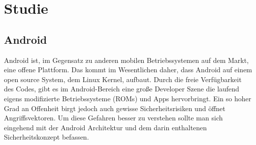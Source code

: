 \chapter{Studie}
\section{Android}
Android ist, im Gegensatz zu anderen mobilen Betriebssystemen auf dem Markt, eine offene Plattform. Das kommt im Wesentlichen daher, dass Android auf einem open source System, dem Linux Kernel, aufbaut. Durch die freie Verfügbarkeit des Codes, gibt es im Android-Bereich eine große Developer Szene die laufend eigens modifizierte Betriebssysteme (ROMs) und Apps hervorbringt.
Ein so hoher Grad an Offenheit birgt jedoch auch gewisse Sicherheitsrisiken und öffnet Angriffsvektoren. Um diese Gefahren besser zu verstehen sollte man sich eingehend mit der Android Architektur und dem darin enthaltenen Sicherheitskonzept befassen.

